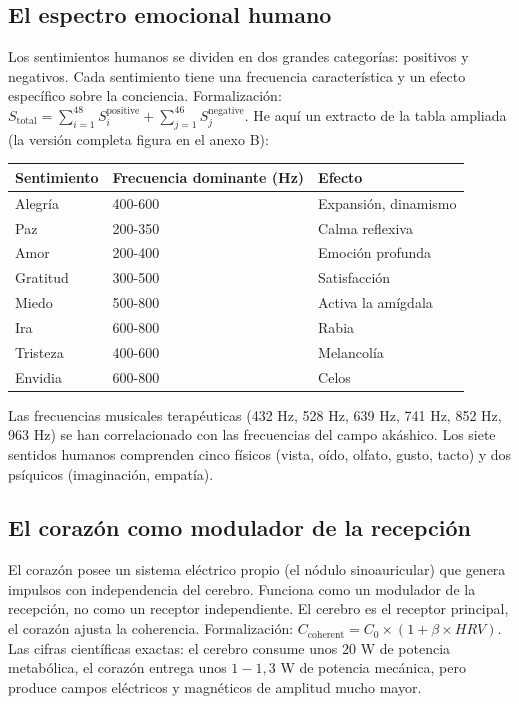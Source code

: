 \subsection{El espectro emocional humano}
Los sentimientos humanos se dividen en dos grandes categorías: positivos y negativos. Cada sentimiento tiene una frecuencia característica y un efecto específico sobre la conciencia. Formalización: $S_{\text{total}} = \sum_{i=1}^{48} S_i^{\text{positive}} + \sum_{j=1}^{46} S_j^{\text{negative}}$. He aquí un extracto de la tabla ampliada (la versión completa figura en el anexo B):
\begin{table}[H]
\centering
\begin{tabular}{@{}lll@{}}
\toprule
\textbf{Sentimiento} & \textbf{Frecuencia dominante (Hz)} & \textbf{Efecto} \\ \midrule
Alegría & 400-600 & Expansión, dinamismo \\
Paz & 200-350 & Calma reflexiva \\
Amor & 200-400 & Emoción profunda \\
Gratitud & 300-500 & Satisfacción \\
Miedo & 500-800 & Activa la amígdala \\
Ira & 600-800 & Rabia \\
Tristeza & 400-600 & Melancolía \\
Envidia & 600-800 & Celos \\ \bottomrule
\end{tabular}
\end{table}
Las frecuencias musicales terapéuticas (432 Hz, 528 Hz, 639 Hz, 741 Hz, 852 Hz, 963 Hz) se han correlacionado con las frecuencias del campo akáshico. Los siete sentidos humanos comprenden cinco físicos (vista, oído, olfato, gusto, tacto) y dos psíquicos (imaginación, empatía).

\subsection{El corazón como modulador de la recepción}
El corazón posee un sistema eléctrico propio (el nódulo sinoauricular) que genera impulsos con independencia del cerebro. Funciona como un modulador de la recepción, no como un receptor independiente. El cerebro es el receptor principal, el corazón ajusta la coherencia. Formalización: $C_{\text{coherent}} = C_0 \times (1 + \beta \times HRV)$. Las cifras científicas exactas: el cerebro consume unos $20$ W de potencia metabólica, el corazón entrega unos $1-1,3$ W de potencia mecánica, pero produce campos eléctricos y magnéticos de amplitud mucho mayor.

